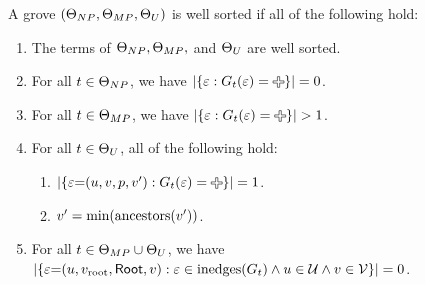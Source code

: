 \begin{definition}
  A grove $(\Set[NP], \Set[MP], \Set[U])$ is well sorted if all of the following hold:
  \begin{enumerate}
    \item The terms of $\Set[NP], \Set[MP],$ and $\Set[U]$ are well sorted.
    \item For all $t \in \Set[NP]$,
      we have $\SizeOf{\SetOf{\e \SuchThat{G_t(\e) = \Plus}}} = 0$.
    \item For all $t \in \Set[MP]$,
      we have $\SizeOf{\SetOf{\e \SuchThat{G_t(\e) = \Plus}}} > 1$.
    \item For all $t \in \Set[U]$, all of the following hold:
      \begin{enumerate}
        \item $\SizeOf{\SetOf{\e{=}(u, v, p, v') \SuchThat{G_t(\e) = \Plus}}} = 1$.
        \item $v' = \min{\ancestors{v'}}$.
      \end{enumerate}
    \item For all $t \in \Set[MP] \cup \Set[U]$,
      we have $\SizeOf{\SetOf{\e{=}(u, \rootVertex, \Root, v) \SuchThat{\e \in \inedges{G_t} \land u \in \U \land v \in \V}}} = 0$.
  \end{enumerate}
\end{definition}

